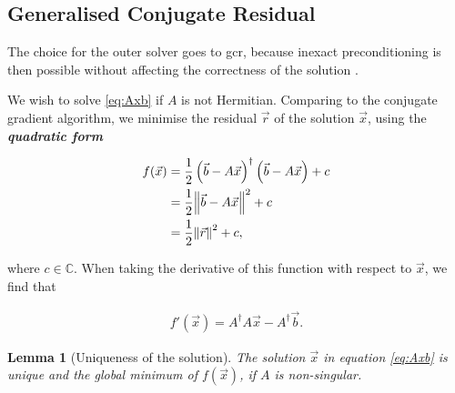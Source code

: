 \documentclass{article}
\theoremstyle{plain} %
\newtheorem{lemma}[theorem]{Lemma}
\theoremstyle{convention} %
\theoremstyle{remark} %
\def\df#1{\textbf{\textit{#1}}}
\numberwithin{equation}{section}
\begin{document}
\subsection{Generalised Conjugate Residual}

The choice for the outer solver goes to \acrshort{gcr}, because inexact preconditioning is then possible without affecting the correctness of the solution \cite{luscher2004,luscher2007}.

We wish to solve \eqref{eq:Axb} if $A$ is not Hermitian. Comparing to the conjugate gradient algorithm, we minimise the residual $\vec{r}$ of the solution $\vec{x}$, using the \df{quadratic form}

\begin{align*}
    f(\vec{x}) &= \frac{1}{2} \left( \vec{b} - A \vec{x} \right)^{\dagger} \left( \vec{b} - A \vec{x} \right) + c \\
               &= \frac{1}{2} \norm{ \vec{b} - A \vec{x} }^2 + c\\
               &= \frac{1}{2} \norm{ \vec{r} }^2 + c,
\end{align*}

where $c \in \mathbb{C}$. When taking the derivative of this function with respect to $\vec{x}$, we find that

\begin{align*}
    f'(\vec{x}) = A^{\dagger} A \vec{x} - A^{\dagger} \vec{b}.
\end{align*}

\begin{lemma}[Uniqueness of the solution]
The solution $\vec{x}$ in equation \eqref{eq:Axb} is unique and the global minimum of $f(\vec{x})$, if $A$ is non-singular.
\end{lemma}
\end{document}
